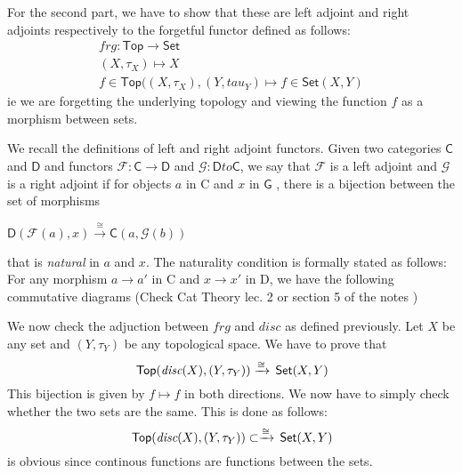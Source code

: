 \begin{frame}
    
For the second part, we have to show that these are left adjoint and right
adjoints respectively to the forgetful functor defined as follows: 
\begin{gather*}
    frg : \textsf{Top} \to \textsf{Set} \\
    (X, \tau_X ) \mapsto X \\
    f \in \textsf{Top}((X,\tau_X),(Y,tau_Y ) \mapsto f \in \textsf{Set}(X,Y) 
\end{gather*}
ie we are forgetting the underlying topology and viewing the function \(f\) as a
morphism between sets. 
\end{frame}
\begin{frame}
    
We recall the definitions of left and right adjoint functors. Given two
categories \(\textsf{C}\) and \(\textsf{D}\) and functors \(\mathcal{F}:
\textsf{C} \to \textsf{D}\) and \(\mathcal{G}: \textsf{D} to \textsf{C}\), we
say that \(\mathcal{F}\) is a left adjoint and \(\mathcal{G}\) is a right
adjoint if for objects \(a\) in \textsf{C} and \(x\) in \(\textsf{G}\) , there
is a bijection between the set of morphisms 

\(\textsf{D}(\mathcal{F}(a) , x) \xrightarrow{\cong} \textsf{C}(a,
\mathcal{G}(b))\)

that is \textit{natural} in \(a\) and \(x\). The naturality condition is
formally stated as follows: For any morphism \(a \to a'\) in \textsf{C} and \(x
\to x'\) in \textsf{D}, we have the following commutative diagrams (Check Cat
Theory lec. 2 or section 5 of the notes )
\end{frame}
\begin{frame}
    
We now check the adjuction between \(frg\) and \(disc\) as  defined previously.
Let \(X \) be any set and \((Y,\tau_Y)\) be any topological space. We have to
prove that 
\begin{equation}
    \,\textsf{Top}(\textit{disc}(X) , (Y, \tau_Y)  ) \xrightarrow{\cong} \,\textsf{Set}(X, Y)
\end{equation}
This bijection is given by  \(f \mapsto f \) in both directions. We now have to
simply check whether the two sets are the same. This is done as follows: 
\begin{equation}
    \,\textsf{Top}(\textit{disc}(X) , (Y, \tau_Y)  ) \subset \xrightarrow{\cong} \,\textsf{Set}(X, Y)
\end{equation}
is obvious since continous functions are functions between the sets. 
\end{frame}
